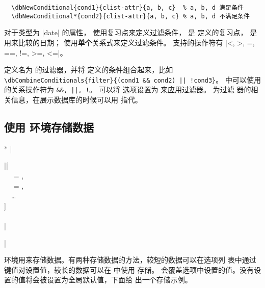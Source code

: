 \documentclass[full]{l3doc}
\begin{document}
\begin{documentation}
\begin{verbatim}
  \dbNewConditional{cond1}{clist-attr}{a, b, c}  % a, b, d 满足条件
  \dbNewConditional*{cond2}{clist-attr}{a, b, c} % a, b, d 不满足条件
\end{verbatim}

  对于类型为 |date| 的属性， 使用复习点来定义过滤条件，
   是  定义的复习点， 是
  用来比较的日期； 使用\textbf{单个}关系式来定义过滤条件。
  支持的操作符有 |<, >, =, ==, !=, >=, <=|。

\begin{function}{\dbCombineConditionals}
  \begin{syntax}
       
  \end{syntax}

   定义名为  的过滤器，并将
   定义的条件组合起来，比如
  \verb=\dbCombineConditionals{filter}{(cond1 && cond2) || !cond3}=。
   中可以使用的关系操作符为 \verb=&&, ||, !=。
  可以将  选项设置为  来应用过滤器。 为过滤
  器的相关信息，在展示数据库的时候可以用  指代。
\end{function}

\subsection{使用  环境存储数据}

\noindent{}
\begin{Syntax}*
  |\begin{dbitem}|[ \\
  ~~ = , \\
  ~~ = , \\
  ~~\ldots{} \\
  ] \\
  ~~ \\
  |\end{dbitem}|
\end{Syntax}

   环境用来存储数据。有两种存储数据的方法，较短的数据可以在选项列
  表中通过键值对设置值，较长的数据可以在  中使用  存储。
  会覆盖选项中设置的值。没有设置的值将会被设置为全局默认值，下面给
  出一个存储示例。


\end{documentation}
\end{document}
